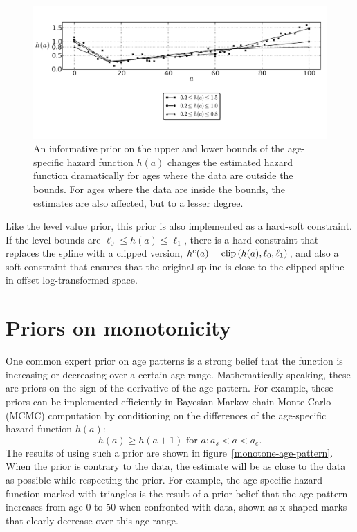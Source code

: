 \begin{figure}[h]
\begin{center}
\includegraphics[width=\textwidth]{level_bound-smoothing-splines.pdf}
\caption[An informative prior on the upper and lower bounds of the
  age-specific hazard function $h(a)$.]{An informative prior on the
  upper and lower bounds of the age-specific hazard function $h(a)$
  changes the estimated hazard function dramatically for
  ages where the data are outside the bounds. For ages where the data
  are inside the bounds, the estimates are also affected, but to a lesser degree.}
\label{level-bounds-priors}
\end{center}
\end{figure}



Like the level value prior, this prior is also implemented as a
hard-soft constraint.  If the level bounds are $\ell_0 \leq h(a)
\leq \ell_1$, there is a hard constraint that replaces the spline with a
clipped version, $h^c(a) = \operatorname{clip}\left(h(a), \ell_0, \ell_1\right)$, and
also a soft constraint that ensures that the original spline is close to the clipped
spline in offset log-transformed space.

\section{Priors on monotonicity}

One common expert prior on age patterns is a strong belief that the
function is increasing or decreasing over a certain age
range. Mathematically speaking, these are priors on the sign of the
derivative of the age pattern.  For example, these priors can be implemented efficiently in
Bayesian Markov chain Monte Carlo (MCMC) computation by conditioning on the differences of the
age-specific hazard function $h(a)$:
\[
h(a) \geq h(a+1) \text{ for } a : a_s < a < a_e.
\]
The results of using such a prior are shown in
figure~\ref{monotone-age-pattern}.
When the prior is contrary to the data, the estimate will be
  as close to the data as possible while respecting the prior.  For
  example, the age-specific hazard function marked with triangles is the result
  of a prior belief that the age pattern increases from age $0$ to
  $50$ when confronted with data, shown as x-shaped marks that
  clearly decrease over this age range.


